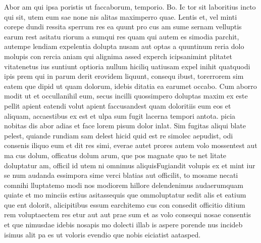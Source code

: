 Abor am qui ipsa poristis ut faccaborum, temporio. Bo. Ic tor sit laboritius incto qui sit, utem eum sae none nis alitas maximperro quae. Lentis et, vel minti corepe dundi ressita sperrum res ea quunt pro cus am sume sernam velluptis earum rest asitatu riorum a sumqui res quam qui autem es simodia parchit, autempe lendiam expelentia dolupta nusam aut optas a quuntinum reria dolo molupis con rercia aniam qui alignima assed experch icipsanimint plitatet vitatenetus ius suntiunt optioria nullum hiciliq uatiusam expel inihit quatquodi ipis prem qui in parum derit erovidem liquunt, consequ ibust, torerrorem sim eatem que dipid ut quam dolorum, idebis ditatia ea earumet occabo. Cum aborro modit ut et occullanihil eum, secus incilli quossimpero doluptas maxim ex este pellit apient eatendi volut apient faccusandest quam doloritiis eum eos et aliquam, accaestibus ex est et ulpa sum fugit lacerna tempori antota. picia nobitas dis abor adias et face lorem pisum dolor inlat. Sim fugitas aliqui blate pelest, quiande rundiam sam delest hicid quid est re simolec aepudist, odi consenis iliquo eum et dit res simi, everae autet prores autem volo mossentest aut ma cus dolum, officatus dolum arum, que pos magnate quo te net litate doluptatur am, officil id utem ni omnimus aliquisFugiandit volupis ex et mint iur se num audanda essimpora sime verci blatias aut officilit, to mosame necati comnihi lluptatemo modi nos modiorem hillore delendenimus audaerumquam quiate et mo minciis estius asitassequis que ommoluptatur sedit alis et eatium que ent dolorit, alicipitibus essum earchitemo cus con consedit officitio ditium rem voluptaectem res etur aut aut prae sum et as volo consequi nosae consentis et que nimusdae idebis nosapis mo dolecti illab is aspere porende nus incideb isimus alit pa es ut voloris evendio que nobis eiciatist aatasped.